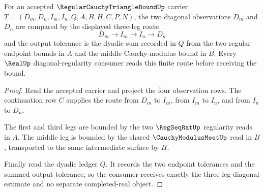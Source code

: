 \begin{theorem}
\label{thm:regular-cauchy-triangle-bound-diagonal-regularity}
For an accepted $\RegularCauchyTriangleBoundUp$ carrier $T=(D_m,D_n,I_m,I_n,Q,A,B,H,C,P,N)$, the two diagonal observations $D_m$ and $D_n$ are compared by the displayed three-leg route
$$
D_m \longrightarrow I_m \longrightarrow I_n \longrightarrow D_n
$$
and the output tolerance is the dyadic sum recorded in $Q$ from the two regular endpoint bounds in $A$ and the middle Cauchy-modulus bound in $B$. Every $\RealUp$ diagonal-regularity consumer reads this finite route before receiving the bound.
\end{theorem}
\begin{proof}
Read the accepted carrier and project the four observation rows. The continuation row $C$ supplies the route from $D_m$ to $I_m$, from $I_m$ to $I_n$, and from $I_n$ to $D_n$.

The first and third legs are bounded by the two $\RegSeqRatUp$ regularity reads in $A$. The middle leg is bounded by the shared $\CauchyModulusMeetUp$ read in $B$, transported to the same intermediate surface by $H$.

Finally read the dyadic ledger $Q$. It records the two endpoint tolerances and the summed output tolerance, so the consumer receives exactly the three-leg diagonal estimate and no separate completed-real object.
\end{proof}

